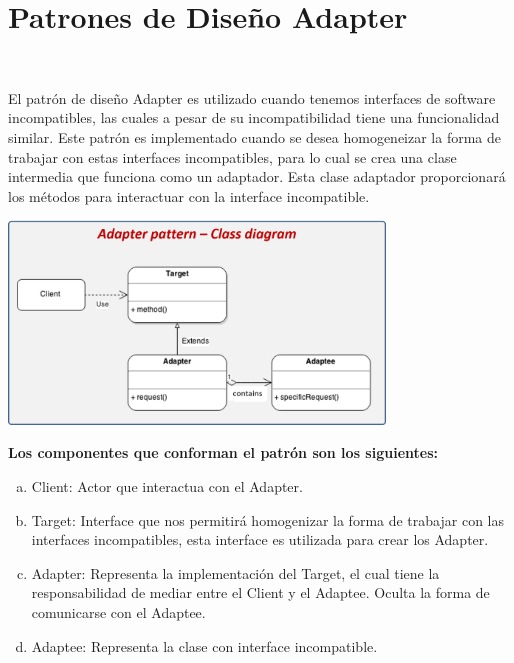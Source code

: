 \section{Patrones de Diseño Adapter} 
\textbf{}\\
\begin{flushleft}
El patrón de diseño Adapter es utilizado cuando tenemos interfaces de software incompatibles, las cuales a pesar de su incompatibilidad tiene una funcionalidad similar. Este patrón es implementado cuando se desea homogeneizar la forma de trabajar con estas interfaces incompatibles, para lo cual se crea una clase intermedia que funciona como un adaptador. Esta clase adaptador proporcionará los métodos para interactuar con la interface incompatible.


	\begin{center}
	\includegraphics[width=10cm]{./Imagenes/adapter} 
	\end{center}

\textbf{  Los componentes que conforman el patrón son los siguientes:}\\
\begin{enumerate}[a)]
\item Client: Actor que interactua con el Adapter.
\item Target: Interface que nos permitirá homogenizar la forma de trabajar con las interfaces incompatibles, esta interface es utilizada para crear los Adapter.
\item Adapter: Representa la implementación del Target, el cual tiene la responsabilidad de mediar entre el Client y el Adaptee. Oculta la forma de comunicarse con el Adaptee.
\item Adaptee: Representa la clase con interface incompatible.
                                                                                                                                                                                                             
\newpage



\end{enumerate}
\end{flushleft}
